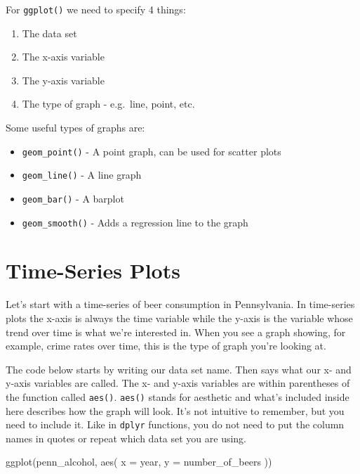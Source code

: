 \documentclass[
]{krantz}
\makeatletter
\newenvironment{Shaded}{\begin{snugshade}}{\end{snugshade}}
\newcommand{\AttributeTok}[1]{\textcolor[rgb]{0.61,0.61,0.61}{#1}}
\newcommand{\FunctionTok}[1]{\textcolor[rgb]{0,0,0}{#1}}
\newcommand{\NormalTok}[1]{#1}
\providecommand{\tightlist}{%
  \setlength{\itemsep}{0pt}\setlength{\parskip}{0pt}}
\newenvironment{kframe}{%
\medskip{}
\setlength{\fboxsep}{.8em}
 \def\at@end@of@kframe{}%
 \ifinner\ifhmode%
  \def\at@end@of@kframe{\end{minipage}}%
  \begin{minipage}{\columnwidth}%
 \fi\fi%
 \def\FrameCommand##1{\hskip\@totalleftmargin \hskip-\fboxsep
 \colorbox{shadecolor}{##1}\hskip-\fboxsep
     \hskip-\linewidth \hskip-\@totalleftmargin \hskip\columnwidth}%
 \MakeFramed {\advance\hsize-\width
   \@totalleftmargin\z@ \linewidth\hsize
   \@setminipage}}%
 {\par\unskip\endMakeFramed%
 \at@end@of@kframe}
\renewenvironment{Shaded}{\begin{kframe}}{\end{kframe}}
\makeatother
\begin{document}
For \texttt{ggplot()} we need to specify 4 things:

\begin{enumerate}
\def\labelenumi{\arabic{enumi}.}
\tightlist
\item
  The data set
\item
  The x-axis variable
\item
  The y-axis variable
\item
  The type of graph - e.g.~line, point, etc.
\end{enumerate}

Some useful types of graphs are:

\begin{itemize}
\tightlist
\item
  \texttt{geom\_point()} - A point graph, can be used for
  scatter plots
\item
  \texttt{geom\_line()} - A line graph
\item
  \texttt{geom\_bar()} - A barplot
\item
  \texttt{geom\_smooth()} - Adds a regression line to the
  graph
\end{itemize}

\hypertarget{time-series-plots}{%
\section{Time-Series Plots}\label{time-series-plots}}

Let's start with a time-series of beer consumption in
Pennsylvania. In time-series plots the x-axis is always the
time variable while the y-axis is the variable whose trend
over time is what we're interested in. When you see a graph
showing, for example, crime rates over time, this is the
type of graph you're looking at.

The code below starts by writing our data set name. Then
says what our x- and y-axis variables are called. The x- and
y-axis variables are within parentheses of the function
called \texttt{aes()}. \texttt{aes()} stands for aesthetic
and what's included inside here describes how the graph will
look. It's not intuitive to remember, but you need to
include it. Like in \texttt{dplyr} functions, you do not
need to put the column names in quotes or repeat which data
set you are using.

\begin{Shaded}
\begin{Highlighting}[]
\FunctionTok{ggplot}\NormalTok{(penn\_alcohol, }\FunctionTok{aes}\NormalTok{(}
  \AttributeTok{x =}\NormalTok{ year,}
  \AttributeTok{y =}\NormalTok{ number\_of\_beers}
\NormalTok{))}
\end{Highlighting}
\end{Shaded}
\end{document}
